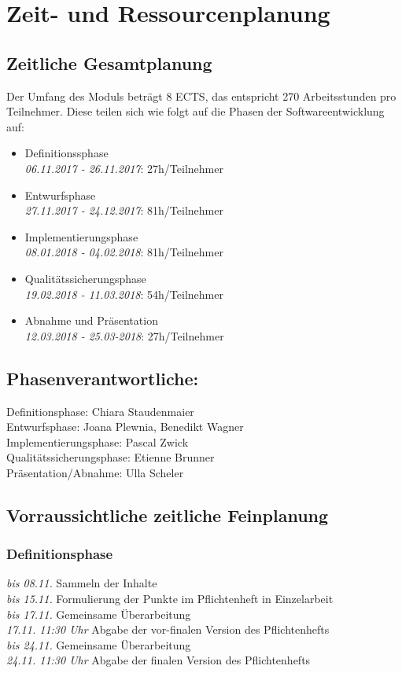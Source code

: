\documentclass[parskip=full]{scrartcl}
\begin{document}
        
\section{Zeit- und Ressourcenplanung}
\subsection{Zeitliche Gesamtplanung}
Der Umfang des Moduls beträgt 8 ECTS, das entspricht 270 Arbeitsstunden pro Teilnehmer. Diese teilen sich wie folgt auf die Phasen der Softwareentwicklung auf: \\
\begin{itemize}
\item Definitionssphase\\ \textit{06.11.2017 - 26.11.2017}: 27h/Teilnehmer 
\item Entwurfsphase\\ \textit{27.11.2017 - 24.12.2017}: 81h/Teilnehmer
\item Implementierungsphase\\ \textit{08.01.2018 - 04.02.2018}:  81h/Teilnehmer
\item Qualitätssicherungsphase\\ \textit{19.02.2018 - 11.03.2018}: 54h/Teilnehmer
\item Abnahme und Präsentation\\ \textit{12.03.2018 - 25.03-2018}:  27h/Teilnehmer
\end{itemize}

\subsection{Phasenverantwortliche:}
Definitionsphase: Chiara Staudenmaier\\
Entwurfsphase: Joana Plewnia, Benedikt Wagner\\
Implementierungsphase: Pascal Zwick\\
Qualitätssicherungsphase: Etienne Brunner\\
Präsentation/Abnahme: Ulla Scheler\\
\subsection{Vorraussichtliche zeitliche Feinplanung}
\subsubsection{Definitionsphase}
\textit{bis 08.11.} Sammeln der Inhalte\\
\textit{bis 15.11.} Formulierung der Punkte im Pflichtenheft in Einzelarbeit\\
\textit{bis 17.11.} Gemeinsame Überarbeitung\\
\textit{17.11. 11:30 Uhr} Abgabe der vor-finalen Version des Pflichtenhefts\\
\textit{bis 24.11.} Gemeinsame Überarbeitung\\
\textit{24.11. 11:30 Uhr} Abgabe der finalen Version des Pflichtenhefts \\
\end{document}
